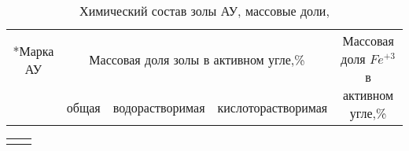 \begin{table}[h] %
\caption{
Химический состав золы АУ, массовые доли,%
}
\label{tabular:him-sostav-zoli}
\begin{center}
\begin{tabular}{ccccc}
\hline
\bigstrut\multirow{2}*{Марка АУ}&\multicolumn{3}{c}{Массовая доля золы в активном угле,\%}&\multirow{2}{*}{\parbox{3cm}{Массовая доля $Fe^{+3}$ в активном угле,\%}}\\
\cline{2-4}
\bigstrut&общая&водорастворимая&кислоторастворимая&\\

\hline
\hline
\end{tabular}
\end{center}
\end{table}


\begin{tabular}{>{\centering}p{1.5cm}|>{\centering\arraybackslash}p{1.5cm}} %
\begin{tabular}{c}
\multicolumn{1}{m{1cm}}{Массовая }\\
\end{tabular}
